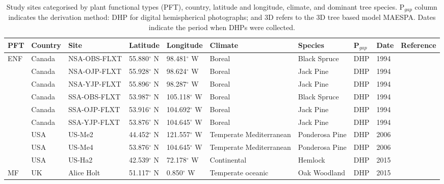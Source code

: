 \begin{sidewaystable}
\caption{Study sites categorised by plant functional types (PFT), country, latitude and longitude, climate, and dominant tree species. P$_{gap}$ column indicates the derivation method: DHP for digital hemispherical photographs; and 3D refers to the 3D tree based model MAESPA. Dates indicate the period when DHPs were collected. }
\begin{tabular}{p{1.0cm} p{1.5cm} p{2.1cm} p{2.1cm} p{2.1cm} p{2.1cm} p{2.1cm} p{2.5cm} p{1.0cm} p{2.1cm}}
\hline
\hline   
\bf PFT & \bf Country & \bf Site & \bf Latitude & \bf Longitude & \bf Climate & \bf Species & \bf P$_{gap}$ & \bf Date & \bf Reference\\
 \hline
\multirow{9}{*}{ENF} 
     & Canada &  NSA-OBS-FLXT &   55.880$^{\circ}$ N & 98.481$^{\circ}$ W & Boreal & Black Spruce & DHP & 1994 & \citet{Sellers1997}\\
     & Canada &  NSA-OJP-FLXT &   55.928$^{\circ}$ N & 98.624$^{\circ}$ W & Boreal & Jack Pine    & DHP & 1994 & \citet{Sellers1997}\\
     & Canada &  NSA-YJP-FLXT &   55.896$^{\circ}$ N & 98.287$^{\circ}$ W & Boreal & Jack Pine & DHP & 1994 & \citet{Sellers1997}\\
     & Canada &  SSA-OBS-FLXT &   53.987$^{\circ}$ N & 105.118$^{\circ}$ W & Boreal & Black Spruce & DHP & 1994 & \citet{Sellers1997}\\
     & Canada &  SSA-OJP-FLXT &   53.916$^{\circ}$ N & 104.692$^{\circ}$ W & Boreal & Jack Pine & DHP & 1994 & \citet{Sellers1997}\\
     & Canada &  SSA-YJP-FLXT &   53.876$^{\circ}$ N & 104.645$^{\circ}$ W & Boreal & Jack Pine & DHP & 1994 & \citet{Sellers1997}\\
     & USA    &  US-Me2       &   44.452$^{\circ}$ N & 121.557$^{\circ}$ W & Temperate Mediterranean & Ponderosa Pine & DHP & 2006 & \citet{DeKauwe2011,Thomas2009}\\
     & USA    &  US-Me4       &   53.876$^{\circ}$ N & 104.645$^{\circ}$ W & Temperate Mediterranean & Ponderosa Pine & DHP & 2006 & \citet{DeKauwe2011,Law2001}\\
     & USA    &  US-Ha2       &   42.539$^{\circ}$ N & 72.178$^{\circ}$ W  & Continental & Hemlock & DHP & 2015 & \citet{Hadley2002}\\
\hline
\multirow{1}{*}{MF} 
     & UK   &  Alice Holt   &   51.117$^{\circ}$ N & 0.850$^{\circ}$ W & Temperate oceanic & Oak Woodland & DHP & 2015 & \citet{Wilkinson2012}\\

\end{tabular}
\end{sidewaystable}
